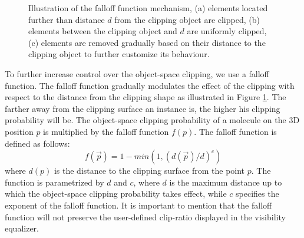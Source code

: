 \begin{figure}[t]
\centering
{}
\caption{\label{fig:falloff} 
Illustration of the falloff function mechanism, (a) elements located further than distance $d$ from the clipping object  are clipped, (b) elements between the clipping object and $d$ are uniformly clipped, (c) elements are removed gradually based on their distance to the clipping object to further customize its behaviour.}
\vspace{-5mm}
\end{figure}


To further increase control over the object-space clipping, we use a falloff function. 
The falloff function gradually modulates the effect of the clipping with respect to the distance from the clipping shape as illustrated in Figure \ref{fig:falloff}.
The farther away from the clipping surface an instance is, the higher his clipping probability will be.
The object-space clipping probability of a molecule on the 3D position $p$ is multiplied by the falloff function $f(p)$. The falloff function is defined as follows:
\begin{equation}
	f(\vec{p}) = 1 - min(1, (d(\vec{p}) / d) ^ c)
\end{equation}
where $d(p)$ is the distance to the clipping surface from the point $p$. 
The function is parametrized by $d$ and $c$, where $d$ is the maximum distance up to which the object-space clipping probability takes effect, while $c$ specifies the exponent of the falloff function.
It is important to mention that the falloff function will not preserve the user-defined clip-ratio displayed in the visibility equalizer.

